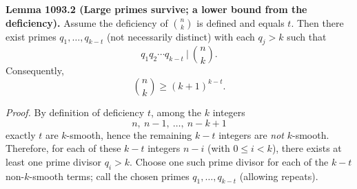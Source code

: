 \textbf{Lemma 1093.2 (Large primes survive; a lower bound from the deficiency).}
Assume the deficiency of $\binom{n}{k}$ is defined and equals $t$.
Then there exist primes $q_1,\dots,q_{k-t}$ (not necessarily distinct) with each $q_j>k$ such that
\[q_1q_2\cdots q_{k-t} \ \Big|\ \binom{n}{k}.
\]
Consequently,
\[\binom{n}{k}\ge (k+1)^{k-t}.
\]

\emph{Proof.}
By definition of deficiency $t$, among the $k$ integers
\[n,\ n-1,\ \dots,\ n-k+1
\]
exactly $t$ are $k$-smooth, hence the remaining $k-t$ integers are \emph{not} $k$-smooth.
Therefore, for each of these $k-t$ integers $n-i$ (with $0\le i<k$), there exists at least one prime divisor $q_i>k$.
Choose one such prime divisor for each of the $k-t$ non-$k$-smooth terms; call the chosen primes $q_1,\dots,q_{k-t}$ (allowing repeats).

